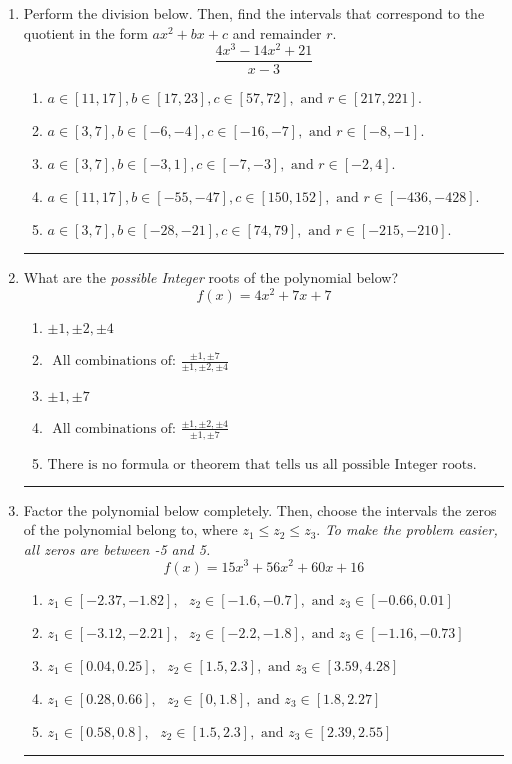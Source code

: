 \documentclass[14pt]{extbook}
\newcommand{\litem}[1]{\item#1\hspace*{-1cm}\rule{\textwidth}{0.4pt}}
\begin{document}
\begin{enumerate}
{\begin{enumerate}[label=\Alph*.]
\end{enumerate} }
\litem{
Perform the division below. Then, find the intervals that correspond to the quotient in the form $ax^2+bx+c$ and remainder $r$.\[ \frac{4x^{3} -14 x^{2} + 21}{x -3} \]\begin{enumerate}[label=\Alph*.]
\item \( a \in [11, 17], b \in [17, 23], c \in [57, 72], \text{ and } r \in [217, 221]. \)
\item \( a \in [3, 7], b \in [-6, -4], c \in [-16, -7], \text{ and } r \in [-8, -1]. \)
\item \( a \in [3, 7], b \in [-3, 1], c \in [-7, -3], \text{ and } r \in [-2, 4]. \)
\item \( a \in [11, 17], b \in [-55, -47], c \in [150, 152], \text{ and } r \in [-436, -428]. \)
\item \( a \in [3, 7], b \in [-28, -21], c \in [74, 79], \text{ and } r \in [-215, -210]. \)

\end{enumerate} }
\litem{
What are the \textit{possible Integer} roots of the polynomial below?\[ f(x) = 4x^{2} +7 x + 7 \]\begin{enumerate}[label=\Alph*.]
\item \( \pm 1,\pm 2,\pm 4 \)
\item \( \text{ All combinations of: }\frac{\pm 1,\pm 7}{\pm 1,\pm 2,\pm 4} \)
\item \( \pm 1,\pm 7 \)
\item \( \text{ All combinations of: }\frac{\pm 1,\pm 2,\pm 4}{\pm 1,\pm 7} \)
\item \( \text{There is no formula or theorem that tells us all possible Integer roots.} \)

\end{enumerate} }
\litem{
Factor the polynomial below completely. Then, choose the intervals the zeros of the polynomial belong to, where $z_1 \leq z_2 \leq z_3$. \textit{To make the problem easier, all zeros are between -5 and 5.}\[ f(x) = 15x^{3} +56 x^{2} +60 x + 16 \]\begin{enumerate}[label=\Alph*.]
\item \( z_1 \in [-2.37, -1.82], \text{   }  z_2 \in [-1.6, -0.7], \text{   and   } z_3 \in [-0.66, 0.01] \)
\item \( z_1 \in [-3.12, -2.21], \text{   }  z_2 \in [-2.2, -1.8], \text{   and   } z_3 \in [-1.16, -0.73] \)
\item \( z_1 \in [0.04, 0.25], \text{   }  z_2 \in [1.5, 2.3], \text{   and   } z_3 \in [3.59, 4.28] \)
\item \( z_1 \in [0.28, 0.66], \text{   }  z_2 \in [0, 1.8], \text{   and   } z_3 \in [1.8, 2.27] \)
\item \( z_1 \in [0.58, 0.8], \text{   }  z_2 \in [1.5, 2.3], \text{   and   } z_3 \in [2.39, 2.55] \)


\end{enumerate}}
\end{enumerate}
\end{document}
